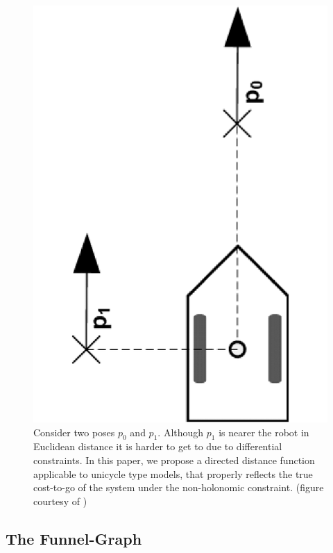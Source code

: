 \begin{figure}
  \centering
  \includegraphics[scale=.2,angle=-90]{figures/rrtfunnel/non-holonomic-vehicle-euclidean-weakness}
  \caption[Distance metrics for non-holonomic vehicles]{Consider two poses \(p_0\) and \(p_1\). Although \(p_1\) is nearer
    the robot in Euclidean distance it is harder to get to due to differential
    constraints. In this paper, we propose a directed distance function
    applicable to unicycle type models, that properly reflects the true
    cost-to-go of the system under the non-holonomic constraint. (figure
    courtesy of \cite{parkFeedbackMotionPlanning2015})}
  \label{fig:non-holonomic-vehicle-euclidean-weakness}
\end{figure}


\subsection{The Funnel-Graph}

